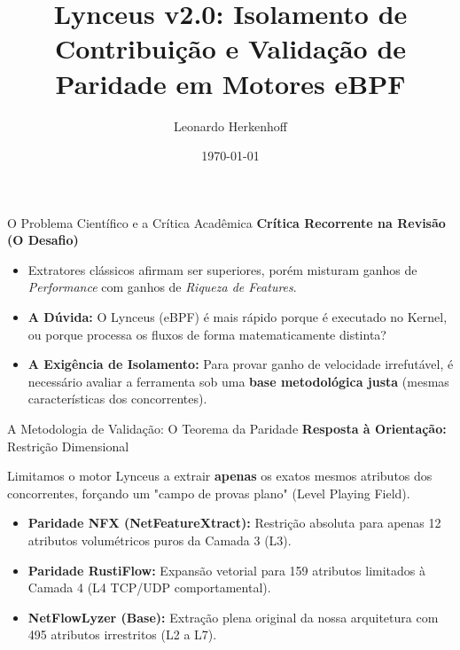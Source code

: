 \documentclass[aspectratio=169,11pt]{beamer}
\title[Lynceus: Validação Científica]{Lynceus v2.0: Isolamento de Contribuição e Validação de Paridade em Motores eBPF}
\author[Herkenhoff, L.]{Leonardo Herkenhoff}
\institute[PPComp/IFES]{Mestrado Profissional em Computação Aplicada (PPComp) -- IFES}
\date{\today}
\begin{document}
\begin{frame}
    \titlepage
\end{frame}

\begin{frame}{O Problema Científico e a Crítica Acadêmica}
    \textbf{Crítica Recorrente na Revisão (O Desafio)}
    \begin{itemize}
        \item Extratores clássicos afirmam ser superiores, porém misturam ganhos de \textit{Performance} com ganhos de \textit{Riqueza de Features}.
        \item \textbf{A Dúvida:} O Lynceus (eBPF) é mais rápido porque é executado no Kernel, ou porque processa os fluxos de forma matematicamente distinta?
        \item \textbf{A Exigência de Isolamento:} Para provar ganho de velocidade irrefutável, é necessário avaliar a ferramenta sob uma \textbf{base metodológica justa} (mesmas características dos concorrentes).
    \end{itemize}
\end{frame}

\begin{frame}{A Metodologia de Validação: O Teorema da Paridade}
    \textbf{Resposta à Orientação:} Restrição Dimensional
    \vspace{0.3cm}
    
    Limitamos o motor Lynceus a extrair \textbf{apenas} os exatos mesmos atributos dos concorrentes, forçando um "campo de provas plano" (Level Playing Field).
    \vspace{0.3cm}
    
    \begin{itemize}
        \item \textbf{Paridade NFX (NetFeatureXtract):} Restrição absoluta para apenas 12 atributos volumétricos puros da Camada 3 (L3).
        \item \textbf{Paridade RustiFlow:} Expansão vetorial para 159 atributos limitados à Camada 4 (L4 TCP/UDP comportamental).
        \item \textbf{NetFlowLyzer (Base):} Extração plena original da nossa arquitetura com 495 atributos irrestritos (L2 a L7).
    \end{itemize}
\end{frame}
\end{document}
